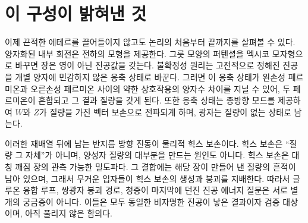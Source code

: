 \begin{classroomqa}
\end{classroomqa}

\begin{classroomqa}
\end{classroomqa}

\section{이 구성이 밝혀낸 것}

이제 끈적한 에테르를 끌어들이지 않고도 논리의 처음부터 끝까지를 살펴볼 수 있다. 양자화된 내부 회전은 전하의 모형을 제공한다. 그릇 모양의 퍼텐셜을 멕시코 모자형으로 바꾸면 장은 영이 아닌 진공값을 갖는다. 불확정성 원리는 고전적으로 정해진 진공을 개별 양자에 민감하지 않은 응축 상태로 바꾼다. 그러면 이 응축 상태가 왼손성 페르미온과 오른손성 페르미온 사이의 약한 상호작용의 양자수 차이를 지닐 수 있어, 두 페르미온이 혼합되고 그 결과 질량을 갖게 된다. 또한 응축 상태는 종방향 모드를 제공하여 $W$와 $Z$가 질량을 가진 벡터 보손으로 전파되게 하며, 광자는 질량이 없는 상태로 남는다.

이러한 재배열 뒤에 남는 반지름 방향 진동이 물리적 힉스 보손이다. 힉스 보손은 ``질량 그 자체''가 아니며, 양성자 질량의 대부분을 만드는 원인도 아니다. 힉스 보손은 대칭 깨짐 장의 관측 가능한 밀도파다. 그 결합에는 해당 장이 만들어 낸 질량의 흔적이 남아 있으며, 그래서 무거운 입자들이 힉스 보손의 생성과 붕괴를 지배한다. 따라서 글루온 융합 루프, 쌍광자 붕괴 경로, 청중이 마지막에 던진 진공 에너지 질문은 서로 별개의 궁금증이 아니다. 이들은 모두 동일한 비자명한 진공이 낳은 결과이자 검증 대상이며, 아직 풀리지 않은 함의다.
